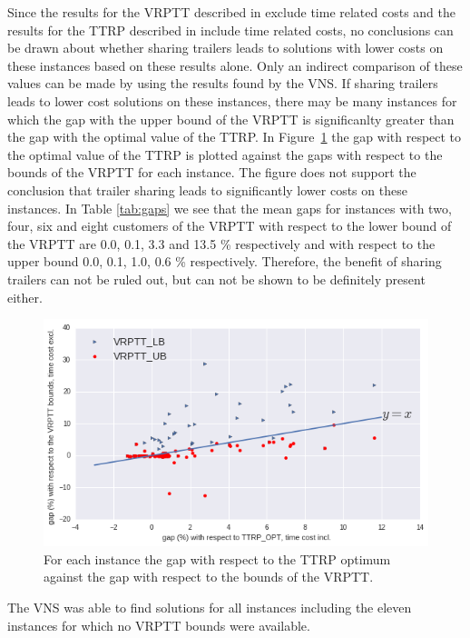 Since the results for the VRPTT described in \cite{drexl2014bandc} exclude time related costs and the results for the TTRP described in \cite{drexl2011branch} include time related costs, no conclusions can be drawn about whether sharing trailers leads to solutions with lower costs on these instances based on these results alone.
Only an indirect comparison of these values can be made by using the results found by the VNS.
If sharing trailers leads  to lower cost solutions on these instances,  there may be many instances for which the gap with the upper bound of the VRPTT is significanlty greater than the gap with the optimal value of the TTRP.
In Figure~\ref{fig:gapvsgap} the gap with respect to the optimal value of the TTRP is  plotted against the gaps with respect to the bounds of the VRPTT for each instance.
The figure does not support the conclusion that trailer sharing leads to significantly lower costs on these instances.
In Table \ref{tab:gaps} we see that the mean gaps for instances with two, four, six and eight customers of the VRPTT with respect to the lower bound of the VRPTT  are 0.0, 0.1, 3.3 and 13.5 \% respectively and with respect to the upper bound 0.0, 0.1, 1.0, 0.6 \% respectively.
Therefore, the benefit of sharing trailers can not be ruled out, but can not be shown to be definitely present either.

\begin{figure}[!ht]
  \centering
    \includegraphics[width=1.0\textwidth]{img/gapvsgap.png}
  \caption{For each instance the gap with respect to the TTRP optimum against the gap with respect to the bounds of the VRPTT. }
  \label{fig:gapvsgap}
\end{figure}


The VNS was able to find solutions for all instances including the eleven instances for which no VRPTT bounds were available.


